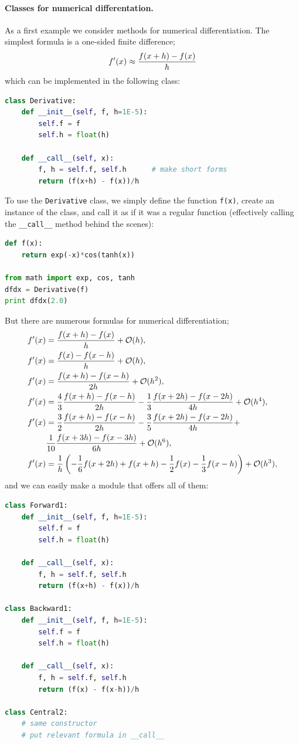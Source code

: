 \documentclass[graybox,envcountchap,sectrefs,final]{svmonodo}
\begin{document}
\paragraph{Classes for numerical differentation.}
As a first example we consider methods for numerical differentiation. The
simplest formula is a one-sided finite difference;
\[ f'(x) \approx {f(x+h)-f(x)\over h} \]
which can be implemented in the following class:
\begin{lstlisting}[language=Python,style=blue1]
class Derivative:
    def __init__(self, f, h=1E-5):
        self.f = f
        self.h = float(h)

    def __call__(self, x):
        f, h = self.f, self.h      # make short forms
        return (f(x+h) - f(x))/h
\end{lstlisting}
To use the \texttt{Derivative} class, we simply define the function \texttt{f(x)},
create an instance of the class, and call it as if it was a regular function
(effectively calling the \Verb!__call__! method behind the scenes):
\begin{lstlisting}[language=Python,style=blue1]
def f(x):
    return exp(-x)*cos(tanh(x))

from math import exp, cos, tanh
dfdx = Derivative(f)
print dfdx(2.0)
\end{lstlisting}
But there are numerous formulas for numerical differentiation;
\begin{align*}
f'(x) &= \frac{f(x+h)-f(x)}{h} + {\cal O}(h) ,\\ 
f'(x) &= \frac{f(x)-f(x-h)}{h} + {\cal O}(h) ,\\ 
f'(x) &= \frac{f(x+h)-f(x-h)}{2h} + {\cal O}(h^2) ,\\ 
f'(x) &=  \frac{4}{3}\frac{f(x+h)-f(x-h)}{2h}
  -\frac{1}{3}\frac{f(x+2h) - f(x-2h)}{4h} + {\cal O}(h^4), \\ 
f'(x) &=  \frac{3}{2}\frac{f(x+h)-f(x-h)}{2h}
  -\frac{3}{5}\frac{f(x+2h) - f(x-2h)}{4h} + \nonumber\\ 
&  \frac{1}{10}\frac{f(x+3h) - f(x-3h)}{6h} + {\cal O}(h^6), \\ 
f'(x) &=  \frac{1}{h}\left(
-\frac{1}{6}f(x+2h) + f(x+h) - \frac{1}{2}f(x) - \frac{1}{3}f(x-h)\right)
  + {\cal O}(h^3),
\end{align*}
and we can easily make a module that offers all of them:
\begin{lstlisting}[language=Python,style=blue1]
class Forward1:
    def __init__(self, f, h=1E-5):
        self.f = f
        self.h = float(h)

    def __call__(self, x):
        f, h = self.f, self.h
        return (f(x+h) - f(x))/h

class Backward1:
    def __init__(self, f, h=1E-5):
        self.f = f
        self.h = float(h)

    def __call__(self, x):
        f, h = self.f, self.h
        return (f(x) - f(x-h))/h

class Central2:
    # same constructor
    # put relevant formula in __call__
\end{lstlisting}
\end{document}
